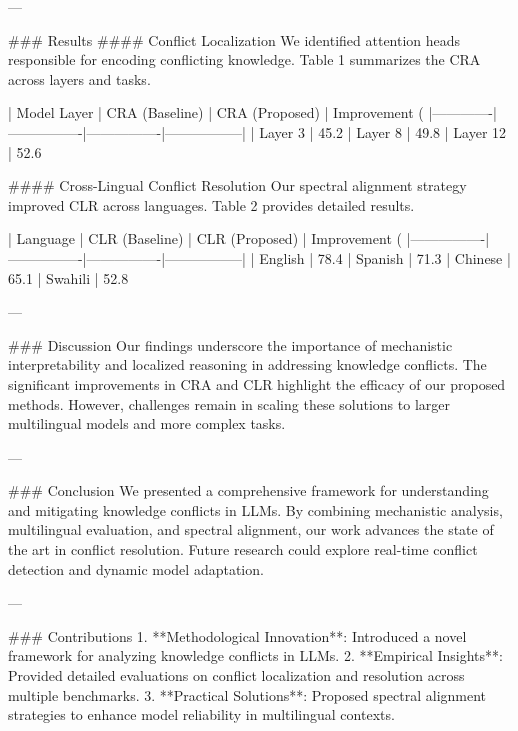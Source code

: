 ---

### Results
#### Conflict Localization
We identified attention heads responsible for encoding conflicting knowledge. Table 1 summarizes the CRA across layers and tasks.

| Model Layer | CRA (Baseline) | CRA (Proposed) | Improvement (%
|-------------|----------------|----------------|-----------------|
| Layer 3     | 45.2%
| Layer 8     | 49.8%
| Layer 12    | 52.6%

#### Cross-Lingual Conflict Resolution
Our spectral alignment strategy improved CLR across languages. Table 2 provides detailed results.

| Language       | CLR (Baseline) | CLR (Proposed) | Improvement (%
|----------------|----------------|----------------|-----------------|
| English        | 78.4%
| Spanish        | 71.3%
| Chinese        | 65.1%
| Swahili        | 52.8%

---

### Discussion
Our findings underscore the importance of mechanistic interpretability and localized reasoning in addressing knowledge conflicts. The significant improvements in CRA and CLR highlight the efficacy of our proposed methods. However, challenges remain in scaling these solutions to larger multilingual models and more complex tasks.

---

### Conclusion
We presented a comprehensive framework for understanding and mitigating knowledge conflicts in LLMs. By combining mechanistic analysis, multilingual evaluation, and spectral alignment, our work advances the state of the art in conflict resolution. Future research could explore real-time conflict detection and dynamic model adaptation.

---

### Contributions
1. **Methodological Innovation**: Introduced a novel framework for analyzing knowledge conflicts in LLMs.
2. **Empirical Insights**: Provided detailed evaluations on conflict localization and resolution across multiple benchmarks.
3. **Practical Solutions**: Proposed spectral alignment strategies to enhance model reliability in multilingual contexts.


